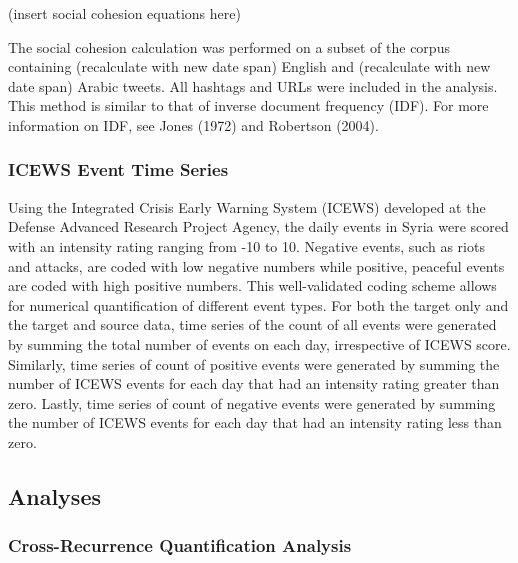 \documentclass[english,man]{apa6}
\begin{document}
(insert social cohesion equations here)

The social cohesion calculation was performed on a subset of the corpus containing (recalculate with new date span) English and (recalculate with new date span) Arabic tweets. All hashtags and URLs were included in the analysis. This method is similar to that of inverse document frequency (IDF). For more information on IDF, see Jones (1972) and Robertson (2004).

\hypertarget{icews-event-time-series}{%
\subsubsection{ICEWS Event Time Series}\label{icews-event-time-series}}

Using the Integrated Crisis Early Warning System (ICEWS) developed at the Defense Advanced Research Project Agency, the daily events in Syria were scored with an intensity rating ranging from -10 to 10. Negative events, such as riots and attacks, are coded with low negative numbers while positive, peaceful events are coded with high positive numbers. This well-validated coding scheme allows for numerical quantification of different event types.
For both the target only and the target and source data, time series of the count of all events were generated by summing the total number of events on each day, irrespective of ICEWS score. Similarly, time series of count of positive events were generated by summing the number of ICEWS events for each day that had an intensity rating greater than zero. Lastly, time series of count of negative events were generated by summing the number of ICEWS events for each day that had an intensity rating less than zero.

\hypertarget{analyses}{%
\subsection{Analyses}\label{analyses}}

\hypertarget{cross-recurrence-quantification-analysis}{%
\subsubsection{Cross-Recurrence Quantification Analysis}\label{cross-recurrence-quantification-analysis}}
\end{document}
